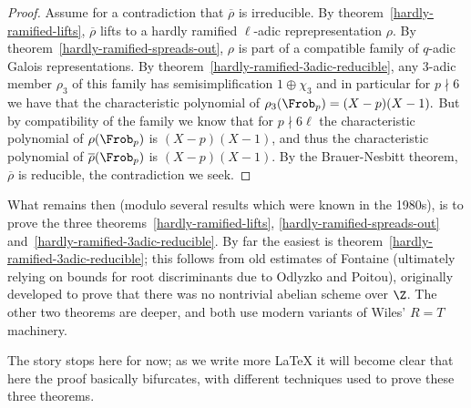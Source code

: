 \begin{proof}
  Assume for a contradiction that $\overline{\rho}$ is irreducible. By theorem~\ref{hardly-ramified-lifts},
  $\overline{\rho}$ lifts to a hardly ramified $\ell$-adic reprepresentation $\rho$. By
  theorem~\ref{hardly-ramified-spreads-out}, $\rho$ is part of a compatible family of
  $q$-adic Galois representations. By theorem~\ref{hardly-ramified-3adic-reducible},
  any 3-adic member $\rho_3$ of this family has semisimplification $1\oplus\chi_3$ and in particular
  for $p\nmid 6$ we have that the characteristic polynomial of $\rho_3(\Frob_p)=(X-p)(X-1).$
  But by compatibility of the family we know that for $p\nmid 6\ell$ the characteristic
  polynomial of $\rho(\Frob_p)$ is $(X-p)(X-1)$, and thus the characteristic polynomial
  of $\overline{\rho}(\Frob_p)$ is $(X-p)(X-1)$. By the Brauer-Nesbitt theorem, $\overline{\rho}$
  is reducible, the contradiction we seek.
\end{proof}

What remains then (modulo several results which were known in the 1980s),
is to prove the three theorems~\ref{hardly-ramified-lifts},
\ref{hardly-ramified-spreads-out} and~\ref{hardly-ramified-3adic-reducible}.
By far the easiest is theorem~\ref{hardly-ramified-3adic-reducible}; this follows
from old estimates of Fontaine (ultimately relying on bounds for root discriminants due to
Odlyzko and Poitou), originally developed to prove that there was no
nontrivial abelian scheme over $\Z$. The other two theorems are deeper, and both use
modern variants of Wiles' $R=T$ machinery.

The story stops here for now; as we write more LaTeX it will become clear that here
the proof basically bifurcates, with different techniques used to prove
these three theorems.
